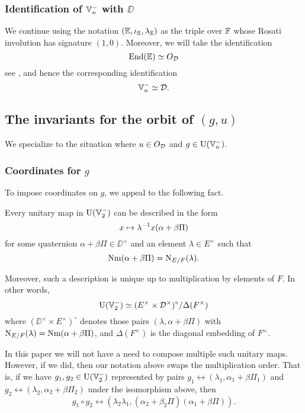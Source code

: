 \subsubsection{Identification of $\mathbb V_n^-$ with $\DD$}
We continue using the notation $(\mathbb E, \iota_\mathbb E, \lambda_\mathbb E)$ as the triple over $\mathbb F$
whose Rosati involution has signature $(1,0)$.
Moreover, we will take the identification
\[ \operatorname{End}(\mathbb E) \simeq O_\mathcal D \]
see \cite[Remark 2.5]{ref:KR},
and hence the corresponding identification
\[ \mathbb V_n^- \simeq \mathcal D. \]

\subsection{The invariants for the orbit of $(g,u)$}
\label{sec:g_u_invariants}

We specialize to the situation where $u \in O_\mathcal D$ and $g \in \operatorname{U}(\mathbb V_n^-)$.

\subsubsection{Coordinates for $g$}
To impose coordinates on $g$, we appeal to the following fact.
\begin{lemma}
  [Description of $\U(\VV_2^-)$]
  Every unitary map in $\U(\VV_2^-)$ can be described in the form
  \[ x \mapsto \lambda^{-1} x (\alpha + \beta \Pi) \]
  for some quaternion $\alpha + \beta \Pi \in \DD^\times$
  and an element $\lambda \in E^\times$ such that
  \[ \operatorname{Nm}(\alpha + \beta \Pi) = \operatorname{N}_{E/F}(\lambda). \]

  Moreover, such a description is unique up to multiplication by elements of $F$.
  In other words,
  \[ \operatorname{U}(\mathbb V_2^-) \simeq (E^\times \times \mathcal D^\times)^\circ / \Delta(F^\times) \]
  where $(\DD^\times \times E^\times)^\circ$
  denotes those pairs $(\lambda, \alpha + \beta \Pi)$
  with $\operatorname{N}_{E/F}(\lambda) = \operatorname{Nm}(\alpha + \beta \Pi)$,
  and $\Delta(F^\times)$ is the diagonal embedding of $F^\times$.
\end{lemma}
\begin{remark}
  In this paper we will not have a need to compose multiple such unitary maps.
  However, if we did, then our notation above swaps the multiplication order.
  That is, if we have $g_1, g_2 \in \operatorname{U}(\mathbb V_2^-)$ represented by pairs
  $g_1 \leftrightarrow (\lambda_1, \alpha_1 + \beta \Pi_1)$
  and $g_2 \leftrightarrow (\lambda_2, \alpha_2 + \beta \Pi_2)$
  under the isomorphism above, then
  \[ g_1 \circ g_2 \leftrightarrow (\lambda_2 \lambda_1, (\alpha_2 + \beta_2 \Pi)(\alpha_1 + \beta \Pi)). \]
\end{remark}

